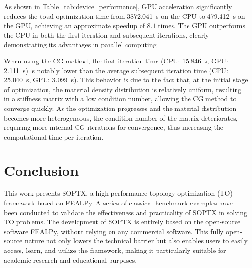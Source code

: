 \documentclass[mathpazo]{cicp}
\begin{document}
As shown in Table~\ref{tab:device_performance}, GPU acceleration significantly reduces the total optimization time from \SI{3872.041}{s} on the CPU to \SI{479.412}{s} on the GPU, achieving an approximate speedup of $8.1$ times. The GPU outperforms the CPU in both the first iteration and subsequent iterations, clearly demonstrating its advantages in parallel computing.

When using the CG method, the first iteration time (CPU: \SI{15.846}{s}, GPU: \SI{2.111}{s}) is notably lower than the average subsequent iteration time (CPU: \SI{25.040}{s}, GPU: \SI{3.099}{s}). This behavior is due to the fact that, at the initial stage of optimization, the material density distribution is relatively uniform, resulting in a stiffness matrix with a low condition number, allowing the CG method to converge quickly. As the optimization progresses and the material distribution becomes more heterogeneous, the condition number of the matrix deteriorates, requiring more internal CG iterations for convergence, thus increasing the computational time per iteration.

\section{Conclusion}
This work presents SOPTX, a high-performance topology optimization (TO) framework based on FEALPy. A series of classical benchmark examples have been conducted to validate the effectiveness and practicality of SOPTX in solving TO problems. The development of SOPTX is entirely based on the open-source software FEALPy, without relying on any commercial software. This fully open-source nature not only lowers the technical barrier but also enables users to easily access, learn, and utilize the framework, making it particularly suitable for academic research and educational purposes.
\end{document}
